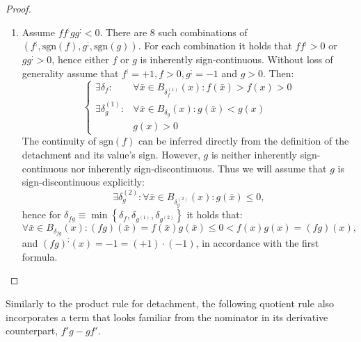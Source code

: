 \documentclass[11pt]{book}
\begin{document}
\begin{proof}
\begin{enumerate}
\item Assume $ff^{;}gg^{;}<0$. There are 8 such combinations of $\left(f^{;},\text{sgn}\left(f\right),g^{;},\text{sgn}\left(g\right)\right)$. For each combination it holds that $ff^{;}>0$ or $gg^{;}>0$, hence either $f$ or $g$ is inherently sign-continuous. Without loss of generality assume that $f^{;}=+1,f>0,g^{;}=-1$ and $g>0$. Then: $$\begin{cases} \exists\delta_{f}: & \forall\bar{x}\in B_{\delta_{f}^{\left(1\right)}}\left(x\right):f\left(\bar{x}\right) > f\left(x\right) >0\\ \exists\delta_{g}^{\left(1\right)}: & \forall\bar{x}\in B_{\delta_{g}}\left(x\right):g\left(\bar{x}\right)< g\left(x\right)\\ & g\left(x\right)>0 \end{cases}$$ The continuity of $\text{sgn}\left(f\right)$ can be inferred directly from the definition of the detachment and its value's sign. However, $g$ is neither inherently sign-continuous nor inherently sign-discontinuous. Thus we will assume that $g$ is sign-discontinuous explicitly: $$\exists\delta_{g}^{\left(2\right)}:\forall\bar{x}\in B_{\delta_{g}^{\left(2\right)}}\left(x\right):g\left(\bar{x}\right)\leq0,$$ hence for $\delta_{fg}\equiv\min\left\{ \delta_{f},\delta_{g^{\left(1\right)}},\delta_{g^{\left(2\right)}}\right\}$ it holds that: $$\forall\bar{x}\in B_{\delta_{fg}}\left(x\right):\left(fg\right)\left(\bar{x}\right)=f\left(\bar{x}\right)g\left(\bar{x}\right)\leq0 < f\left(x\right)g\left(x\right)=\left(fg\right)\left(x\right),$$ and $\left(fg\right)^{;}\left(x\right)=-1=\left(+1\right)\cdot\left(-1\right)$, in accordance with the first formula.
\end{enumerate}
\end{proof}

Similarly to the product rule for detachment, the following quotient rule also incorporates a term that looks familiar from the nominator in its derivative counterpart, $f'g-gf'$.
\end{document}

